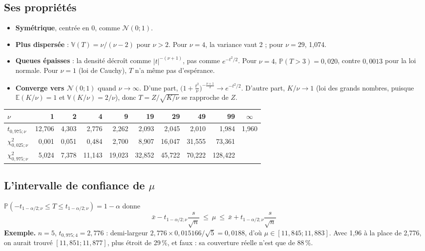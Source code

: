 \documentclass[11pt,a4paper]{article}
\theoremstyle{sj}
\theoremstyle{definition}
\theoremstyle{remark}
\newcommand{\E}{\mathbb{E}}
\newcommand{\V}{\mathbb{V}}
\newcommand{\N}{\mathcal{N}}
\renewcommand{\P}{\mathbb{P}}
\newcommand{\chid}{\chi^2}
\begin{document}
\subsection{Ses propriétés}

\begin{itemize}[leftmargin=1.4em]
\item \textbf{Symétrique}, centrée en 0, comme $\N(0;1)$.
\item \textbf{Plus dispersée} : $\V(T)=\nu/(\nu-2)$ pour $\nu>2$. Pour $\nu=4$, la variance vaut 2 ; pour $\nu=29$, 1,074.
\item \textbf{Queues épaisses} : la densité décroît comme $|t|^{-(\nu+1)}$, pas comme $e^{-t^2/2}$. Pour $\nu=4$, $\P(T>3)=0{,}020$, contre $0{,}0013$ pour la loi normale. Pour $\nu=1$ (loi de Cauchy), $T$ n'a même pas d'espérance.
\item \textbf{Converge vers $\N(0;1)$} quand $\nu\to\infty$. D'une part, $\big(1+\frac{t^2}{\nu}\big)^{-\frac{\nu+1}{2}}\to e^{-t^2/2}$. D'autre part, $K/\nu\to1$ (loi des grands nombres, puisque $\E(K/\nu)=1$ et $\V(K/\nu)=2/\nu$), donc $T=Z/\sqrt{K/\nu}$ se rapproche de $Z$.
\end{itemize}

\begin{center}
\small
\begin{tabular}{l r r r r r r r r c}
\toprule
$\nu$ & 1 & 2 & 4 & 9 & 19 & 29 & 49 & 99 & $\infty$\\
\midrule
$t_{0{,}975;\nu}$ & 12,706 & 4,303 & 2,776 & 2,262 & 2,093 & 2,045 & 2,010 & 1,984 & 1,960\\
$\chid_{0{,}025;\nu}$ & 0,001 & 0,051 & 0,484 & 2,700 & 8,907 & 16,047 & 31,555 & 73,361 & \\
$\chid_{0{,}975;\nu}$ & 5,024 & 7,378 & 11,143 & 19,023 & 32,852 & 45,722 & 70,222 & 128,422 & \\
\bottomrule
\end{tabular}
\end{center}

\subsection{L'intervalle de confiance de $\mu$}

$\P(-t_{1-\alpha/2;\nu}\le T\le t_{1-\alpha/2;\nu})=1-\alpha$ donne
\[
\boxed{\ \bar x-t_{1-\alpha/2;\nu}\frac{s}{\sqrt n}\ \le\ \mu\ \le\ \bar x+t_{1-\alpha/2;\nu}\frac{s}{\sqrt n}\ }
\]
\textbf{Exemple.} $n=5$, $t_{0{,}975;4}=2{,}776$ : demi-largeur $2{,}776\times0{,}015166/\sqrt5=0{,}0188$, d'où $\mu\in[11{,}845;11{,}883]$. Avec 1,96 à la place de 2,776, on aurait trouvé $[11{,}851;11{,}877]$, plus étroit de 29\,\%, et faux : sa couverture réelle n'est que de 88\,\%.
\end{document}

